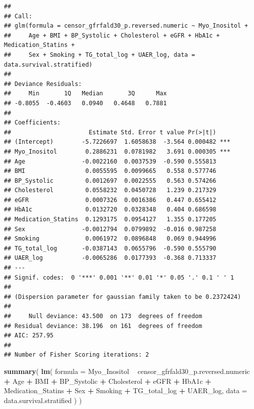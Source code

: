 \documentclass[]{article}
\newenvironment{Shaded}{\begin{snugshade}}{\end{snugshade}}
\newcommand{\DataTypeTok}[1]{\textcolor[rgb]{0.13,0.29,0.53}{#1}}
\newcommand{\KeywordTok}[1]{\textcolor[rgb]{0.13,0.29,0.53}{\textbf{#1}}}
\newcommand{\NormalTok}[1]{#1}
\newcommand{\OperatorTok}[1]{\textcolor[rgb]{0.81,0.36,0.00}{\textbf{#1}}}
\newcommand{\StringTok}[1]{\textcolor[rgb]{0.31,0.60,0.02}{#1}}
\begin{document}
\begin{verbatim}
## 
## Call:
## glm(formula = censor_gfrfald30_p.reversed.numeric ~ Myo_Inositol + 
##     Age + BMI + BP_Systolic + Cholesterol + eGFR + HbA1c + Medication_Statins + 
##     Sex + Smoking + TG_total_log + UAER_log, data = data.survival.stratified)
## 
## Deviance Residuals: 
##     Min       1Q   Median       3Q      Max  
## -0.8055  -0.4603   0.0940   0.4648   0.7881  
## 
## Coefficients:
##                      Estimate Std. Error t value Pr(>|t|)    
## (Intercept)        -5.7226697  1.6058638  -3.564 0.000482 ***
## Myo_Inositol        0.2886231  0.0781982   3.691 0.000305 ***
## Age                -0.0022160  0.0037539  -0.590 0.555813    
## BMI                 0.0055595  0.0099665   0.558 0.577746    
## BP_Systolic         0.0012697  0.0022555   0.563 0.574266    
## Cholesterol         0.0558232  0.0450728   1.239 0.217329    
## eGFR                0.0007326  0.0016386   0.447 0.655412    
## HbA1c               0.0132720  0.0328348   0.404 0.686598    
## Medication_Statins  0.1293175  0.0954127   1.355 0.177205    
## Sex                -0.0012794  0.0799892  -0.016 0.987258    
## Smoking             0.0061972  0.0896848   0.069 0.944996    
## TG_total_log       -0.0387143  0.0655796  -0.590 0.555790    
## UAER_log           -0.0065286  0.0177393  -0.368 0.713337    
## ---
## Signif. codes:  0 '***' 0.001 '**' 0.01 '*' 0.05 '.' 0.1 ' ' 1
## 
## (Dispersion parameter for gaussian family taken to be 0.2372424)
## 
##     Null deviance: 43.500  on 173  degrees of freedom
## Residual deviance: 38.196  on 161  degrees of freedom
## AIC: 257.95
## 
## Number of Fisher Scoring iterations: 2
\end{verbatim}

\begin{Shaded}
\begin{Highlighting}[]
\KeywordTok{summary}\NormalTok{( }
  \KeywordTok{lm}\NormalTok{( }
    \DataTypeTok{formula =} 
\NormalTok{      Myo_Inositol }\OperatorTok{~}\StringTok{ }
\StringTok{      }\NormalTok{censor_gfrfald30_p.reversed.numeric }\OperatorTok{+}\StringTok{ }
\StringTok{      }\NormalTok{Age }\OperatorTok{+}
\StringTok{      }\NormalTok{BMI }\OperatorTok{+}\StringTok{ }
\StringTok{      }\NormalTok{BP_Systolic }\OperatorTok{+}\StringTok{ }
\StringTok{      }\NormalTok{Cholesterol }\OperatorTok{+}\StringTok{ }
\StringTok{      }\NormalTok{eGFR }\OperatorTok{+}\StringTok{ }
\StringTok{      }\NormalTok{HbA1c }\OperatorTok{+}
\StringTok{      }\NormalTok{Medication_Statins }\OperatorTok{+}
\StringTok{      }\NormalTok{Sex }\OperatorTok{+}\StringTok{  }
\StringTok{      }\NormalTok{Smoking }\OperatorTok{+}\StringTok{ }
\StringTok{      }\NormalTok{TG_total_log }\OperatorTok{+}
\StringTok{      }\NormalTok{UAER_log, }
    \DataTypeTok{data =}\NormalTok{ data.survival.stratified}
\NormalTok{  )}
\NormalTok{)}
\end{Highlighting}
\end{Shaded}
\end{document}
